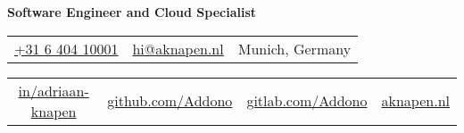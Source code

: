 \documentclass[11pt,a4paper,sans]{moderncv}
\begin{document}
\makecvtitle


\vspace*{-17mm}
\begin{center}\textbf{Software Engineer and Cloud Specialist}\end{center}

\begin{center}
	\begin{tabular}{ c c c }
		\faMobile\enspace 
		\href{tel:+31640410001}{+31 6 404 10001}
		\enspace & \enspace 
		\href{mailto:hi@aknapen.nl}{hi@aknapen.nl}
		\enspace & \enspace 
		\faHome\enspace Munich, Germany
	\end{tabular}
			
	\begin{tabular}{ c c c c }
		\faLinkedin\enspace \color{blue} \href{https://www.linkedin.com/in/adriaan-knapen/}{in/adriaan-knapen} &
		\enspace\enspace\faGithub\enspace \color{blue} \href{https://github.com/Addono}{github.com/Addono} & \enspace\enspace\faGitlab\enspace \color{blue} \href{https://gitlab.com/Addono}{gitlab.com/Addono} & \enspace\enspace\faHome\enspace \color{blue} \href{https://aknapen.nl}{aknapen.nl} 
	\end{tabular}
\end{center}
\end{document}
